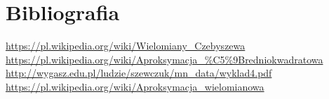 \documentclass[11pt]{scrartcl}
\begin{document}
    \section{Bibliografia}
    \url{https://pl.wikipedia.org/wiki/Wielomiany_Czebyszewa} \\
    \url{https://pl.wikipedia.org/wiki/Aproksymacja_%C5%9Bredniokwadratowa} \\
    \url{http://wygasz.edu.pl/ludzie/szewczuk/mn_data/wyklad4.pdf} \\
    \url{https://pl.wikipedia.org/wiki/Aproksymacja_wielomianowa}
\end{document}
